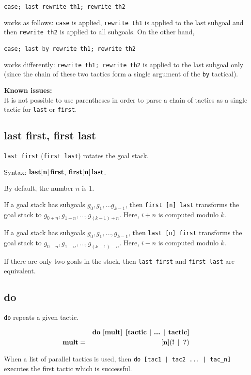 \documentclass[a4paper]{article}
\newcommand{\issues}{{\bf Known issues:}\\}
\newcommand{\xx}[1]{\mathop{\text{\bf #1}}}
\begin{document}
\verb|case; last rewrite th1; rewrite th2| 

works as follows: \verb|case| is applied, \verb|rewrite th1| is applied to the last subgoal and then \verb|rewrite th2| is applied to all subgoals. On the other hand, 

\verb|case; last by rewrite th1; rewrite th2| 

works differently: \verb|rewrite th1; rewrite th2| is applied to the last subgoal only (since the chain of these two tactics form a single argument of the \verb|by| tactical).

\issues
It is not possible to use parentheses in order to parse a chain of tactics as a single tactic for \verb|last| or \verb|first|.


\subsection{last first, first last}
\verb|last first| (\verb|first last|) rotates the goal stack.

Syntax: $\xx{last} [\xx{n}] \xx{first}$, $\xx{first} [\xx{n}] \xx{last}$.

By default, the number $n$ is 1.

If a goal stack has subgoals $g_0, g_1, \ldots g_{k - 1}$, then \verb|first [n] last| transforms the goal stack to $g_{0 + n}, g_{1 + n}, \ldots, g_{(k - 1) + n}$. Here, $i + n$ is computed modulo $k$.

If a goal stack has subgoals $g_0, g_1, \ldots, g_{k - 1}$, then \verb|last [n] first| transforms the goal stack to $g_{0 - n}, g_{1 - n}, \ldots, g_{(k - 1) - n}$. Here, $i - n$ is computed modulo $k$.

If there are only two goals in the stack, then \verb|last first| and \verb|first last| are equivalent.


\subsection{do}
\verb|do| repeats a given tactic.

\begin{eqnarray*}
&&\xx{do}\ [\xx{mult}]\ \xx{[tactic $|$ ... $|$ tactic]}\\
\xx{mult} &=& [\xx{n}](\xx{!}\ |\ \xx{?})
\end{eqnarray*}

When a list of parallel tactics is used, then \verb$do [tac1 | tac2 ... | tac_n]$ executes the first tactic which is successful.
\end{document}
